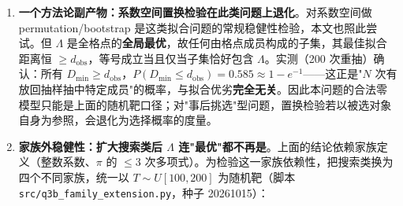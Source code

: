 \documentclass[12pt,a4paper]{article}
\begin{document}
\begin{enumerate}
$3.2\%$；正确式是 $\sum_i\bigl(\min(d,L_i)+\min(d,R_i)\bigr)/R$（$L_i,R_i$ 为站点到胞左右边界的距离），它与覆盖测度在本例相符到 $1.3\times10^{-15}$。顺带把三种“解析”口径的关系说清，免得读者以为互相矛盾：表里的 $p_{\mathrm{Bonf}}=N\cdot 2d/R$ 是并集界（$0.1316$），上文出现的二项近似 $1-(1-2d/R)^N$ 忽略管子重叠（$0.1233$），只有本表的 $p_{\mathrm{exact}}$（$0.126988$）既不算重叠也不加界，是同一被估量的精确值；三者夹住真值，差异本身就量出了重叠效应的大小。(iii) 把“家族本身也是挑的”计入多重比较：对 $K=5$ 个口径取最小 $p$ 后 Bonferroni 得 $0.0110949\times5=0.0555$。但这五个口径是\textbf{嵌套}的（$\Lambda$ 属于每一个，$B\ge4$），最小 $p$ 必然落在最小家族，$K=5$ 本身又是人为选的，故 $0.0555$ \textbf{只能当敏感性指标，不能当频率学 $p$ 值}（工件 \texttt{q5\_\allowbreak{}correlated\_\allowbreak{}and\_\allowbreak{}spacing.json} 的 \texttt{cross\_\allowbreak{}family.note} 亦作此声明）。它的正当用途只有一个：说明\textbf{单看任何一个口径的 $p$ 都是在做选择}。因此可辩护的读法只有一条：在给定家族与给定零模型下，$\Lambda$ 的"最优性"不足以充当 $\alpha^{-1}$ 由纯几何决定的证据；它是事后选择偏差（a posteriori selection bias）的典型形态。顺序统计量还显示，随机靶下 $D_{\min}$ 的中位数是 $1.53\times10^{-3}$、5\% 分位是 $1.16\times10^{-4}$——$\Lambda$ 的拟合优度只是"比典型好一点"，远非异常。
  \item \textbf{一个方法论副产物：系数空间置换检验在此类问题上退化}。对系数空间做 permutation/bootstrap 是这类拟合问题的常规稳健性检验，本文也照此尝试。但 $\Lambda$ 是全格点的\textbf{全局最优}，故任何由格点成员构成的子集，其最佳拟合距离恒 $\ge d_{\text{obs}}$，等号成立当且仅当子集恰好包含 $\Lambda$。实测（200 次重抽）确认：所有 $D_{\min} \ge d_{\text{obs}}$，$P(D_{\min} \le d_{\text{obs}}) = 0.585 \approx 1-e^{-1}$——这正是"$N$ 次有放回抽样抽中特定成员"的概率，与拟合优劣\textbf{完全无关}。因此本问题的合法零模型只能是上面的随机靶口径；对"事后挑选"型问题，置换检验若以被选对象自身为参照，会退化为选择概率的度量。
  \item \textbf{家族外稳健性：扩大搜索类后 $\Lambda$ 连"最优"都不再是}。上面的结论依赖家族定义（整数系数、$\pi$ 的 $\le 3$ 次多项式）。为检验这一家族依赖性，把搜索类换为四个不同家族，统一以 $T \sim U[100,200]$ 为随机靶（脚本 \texttt{src/q3b\_\allowbreak{}family\_\allowbreak{}extension.py}，种子 20261015）：


\end{enumerate}
\end{document}

